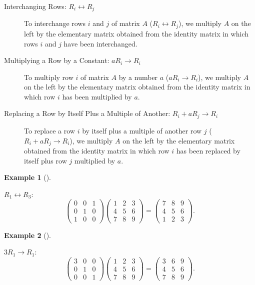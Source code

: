 \documentclass[
  a4paper,
  DIV=11,
  numbers=noendperiod,
  oneside]{scrreprt}
\theoremstyle{definition}
\newtheorem{example}{Example}[chapter]
\theoremstyle{remark}
\begin{document}
\begin{description}
\item[Interchanging Rows: \(R_{i}\leftrightarrow R_{j}\)]
To interchange rows \(i\) and \(j\) of matrix \(A\)
(\(R_{i}\leftrightarrow R_{j}\)), we multiply \(A\) on the left by the
elementary matrix obtained from the identity matrix in which rows \(i\)
and \(j\) have been interchanged.
\item[Multiplying a Row by a Constant: \(aR_{i}\rightarrow R_{i}\)]
To multiply row \(i\) of matrix \(A\) by a number \(a\)
(\(aR_{i}\rightarrow R_{i}\)), we multiply \(A\) on the left by the
elementary matrix obtained from the identity matrix in which row \(i\)
has been multiplied by \(a\).
\item[Replacing a Row by Itself Plus a Multiple of Another:
\(R_{i}+aR_{j}\rightarrow R_{i}\)]
To replace a row \(i\) by itself plus a multiple of another row \(j\)
(\(R_{i}+aR_{j}\rightarrow R_{i}\)), we multiply \(A\) on the left by
the elementary matrix obtained from the identity matrix in which row
\(i\) has been replaced by itself plus row \(j\) multiplied by \(a\).
\end{description}

\begin{example}[]\protect\hypertarget{exm-}{}\label{exm-}

\(R_{1}\leftrightarrow R_{3}\):
\[\left(\begin{array}{ccc}0 & 0 & 1\\ 0 & 1 & 0 \\ 1 & 0 & 0\end{array}\right)\left(\begin{array}{ccc}1 & 2 & 3\\ 4 & 5 & 6 \\ 7 & 8 & 9\end{array}\right)
=\left(\begin{array}{ccc}7 & 8 & 9\\ 4 & 5 & 6 \\ 1 & 2 & 3\end{array}\right).\]

\end{example}

\begin{example}[]\protect\hypertarget{exm-}{}\label{exm-}

\(3R_{1}\rightarrow R_{1}\):
\[\left(\begin{array}{ccc}3 & 0 & 0\\ 0 & 1 & 0 \\ 0 & 0 & 1\end{array}\right)\left(\begin{array}{ccc}1 & 2 & 3\\ 4 & 5 & 6 \\ 7 & 8 & 9\end{array}\right)
=\left(\begin{array}{ccc}3 & 6 & 9\\ 4 & 5 & 6 \\ 7 & 8 & 9\end{array}\right).\]

\end{example}
\end{document}
